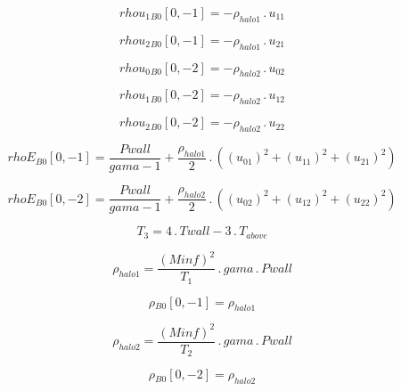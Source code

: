 \documentclass{article}
\begin{document}
\begin{dmath}{rhou_{1}{_{B0}}}[{0,-1}] = - \rho_{halo 1} \,.\, u_{11}\end{dmath}

\begin{dmath}{rhou_{2}{_{B0}}}[{0,-1}] = - \rho_{halo 1} \,.\, u_{21}\end{dmath}

\begin{dmath}{rhou_{0}{_{B0}}}[{0,-2}] = - \rho_{halo 2} \,.\, u_{02}\end{dmath}

\begin{dmath}{rhou_{1}{_{B0}}}[{0,-2}] = - \rho_{halo 2} \,.\, u_{12}\end{dmath}

\begin{dmath}{rhou_{2}{_{B0}}}[{0,-2}] = - \rho_{halo 2} \,.\, u_{22}\end{dmath}

\begin{dmath}{rhoE{_{B0}}}[{0,-1}] = \frac{Pwall}{gama - 1} + \frac{\rho_{halo 1}}{2} \,.\, \left(\left(u_{01} \right)^{2} + \left(u_{11} \right)^{2} + \left(u_{21} \right)^{2}\right)\end{dmath}

\begin{dmath}{rhoE{_{B0}}}[{0,-2}] = \frac{Pwall}{gama - 1} + \frac{\rho_{halo 2}}{2} \,.\, \left(\left(u_{02} \right)^{2} + \left(u_{12} \right)^{2} + \left(u_{22} \right)^{2}\right)\end{dmath}

\begin{dmath}T_{3} = 4 \,.\, Twall - 3 \,.\, T_{above}\end{dmath}

\begin{dmath}\rho_{halo 1} = \frac{\left(Minf \right)^{2}}{T_{1}} \,.\, gama \,.\, Pwall\end{dmath}

\begin{dmath}{\rho{_{B0}}}[{0,-1}] = \rho_{halo 1}\end{dmath}

\begin{dmath}\rho_{halo 2} = \frac{\left(Minf \right)^{2}}{T_{2}} \,.\, gama \,.\, Pwall\end{dmath}

\begin{dmath}{\rho{_{B0}}}[{0,-2}] = \rho_{halo 2}\end{dmath}
\end{document}
